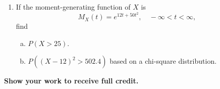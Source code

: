 \documentclass[12pt]{article}
\begin{document}
\begin{enumerate}
    The diameter of a ball bearing is a normally distributed random variable with mean $6$ and standard deviation $\tfrac{1}{2}$.
    \begin{enumerate}[(a)]
      \item What is the probability a randomly selected ball bearing has a diameter between $5$ and $7$?
      \item If a diameter is between $5$ and $7$, the bearing can be sold for a profit of \$1. If the diameter is greater than $7$, the bearing may be reworked and sold at a profit of \$0.50; otherwise, the bearing must be discarded at a loss of \$2. Find the expected value for the profit.
    \end{enumerate}

    \textbf{PLUS}
    \begin{enumerate}[(c)]
      \item If five ball bearings are selected at random, what is the probability that exactly two of them are between $5$ and $7$ in diameter?
    \end{enumerate}

  \newpage
  \item If the moment-generating function of $X$ is
    \[
      M_X(t) = e^{12 t + 50 t^2}, \quad -\infty < t < \infty,
    \]
    find
    \begin{enumerate}[(a)]
      \item $P(X > 25)$.
      \item $P\!\left((X - 12)^2 > 502.4\right)$ based on a chi-square distribution.
    \end{enumerate}
\end{enumerate}

\begin{center}
  \textbf{\large Show your work to receive full credit.}
\end{center}
\end{document}
